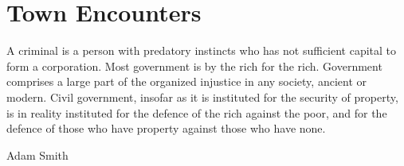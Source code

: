 \section{Town Encounters}

\epigraph{A criminal is a person with predatory instincts who has not sufficient capital to form a corporation. Most government is by the rich for the rich.
Government comprises a large part of the organized injustice in any society, ancient or modern.
Civil government, insofar as it is instituted for the security of property, is in reality instituted for the defence of the rich against the poor, and for the defence of those who have property against those who have none.}%
{Adam Smith}


\renewcommand{\sqarea}{Town}

\setcounter{encnum}{1}

